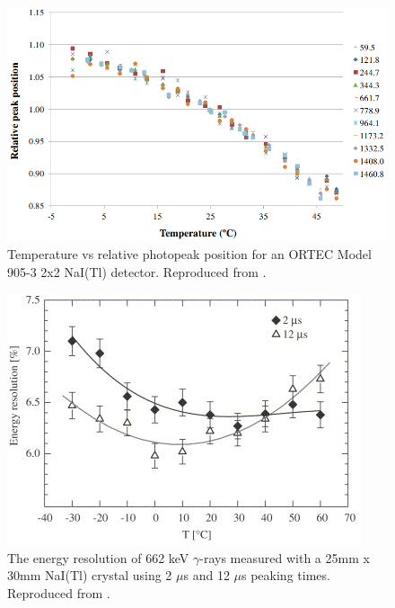 \begin{figure}[H]
	\centering
	\includegraphics[width=0.95\linewidth]{images/temp_vs_relative_peak_position_CASANOVAS2012588}
	\caption{Temperature vs relative photopeak position for an ORTEC Model 905-3 2x2 NaI(Tl) detector.  Reproduced from \cite{CASANOVAS2012588}.}
	\label{fig:CASANOVAS2012588}
\end{figure}



\begin{figure}[H]
	\centering
	\includegraphics[width=0.95\linewidth]{images/temp-dependence-resolution-moszynski}
	\caption{The energy resolution of 662 keV $\gamma$-rays measured with a 25mm x 30mm NaI(Tl) crystal using 2 $\mu$s and 12 $\mu$s peaking times. Reproduced from \cite{MOSZYNSKI2006739}.}
	\label{fig:temp-dependence-resolution-moszynski}
\end{figure}

